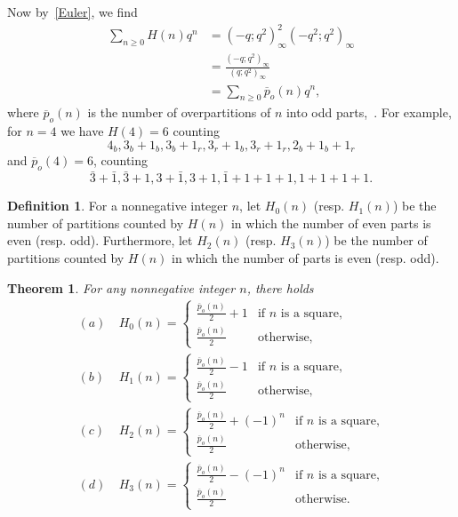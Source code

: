 \documentclass{amsart}
\numberwithin{equation}{section}
\newtheorem{theorem}{Theorem}
\theoremstyle{definition}
\newtheorem{definition}{Definition}
\newcommand{\fr}{\frac}
\begin{document}
%
Now by~\eqref{Euler}, we find
\begin{align}
\sum_{n\geq 0} H(n) q^n &= (-q;q^2)_\infty^2 (-q^2;q^2)_\infty \nonumber \\
&=\fr{(-q;q^2)_\infty}{(q;q^2)_\infty} \nonumber \\
& = \sum_{n\geq 0}\overline{p}_o(n) q^n, \label{H-id}
\end{align}
where $\overline{p}_o(n)$ is the number of overpartitions of $n$ into odd parts,~\cite{Chen, Hirschhorn-Sellers}.
For example, for $n=4$ we have
$H(4)=6$ counting
\[
4_b, 3_b+1_b, 3_b+1_r, 3_r+1_b,3_r+1_r,2_b+1_b+1_r
\]
and $\overline{p}_o(4)=6$, counting
\[
\bar{3}+\bar{1}, \bar{3}+1, 3+\bar{1}, 3+1, \bar{1}+1+1+1, 1+1+1+1.
\]
\begin{definition}
For a nonnegative integer $n$, let $H_0(n)$ (resp. $H_1(n)$) be the number of partitions
counted by $H(n)$ in which the number of even parts is even (resp. odd). Furthermore, let
$H_2(n)$ (resp. $H_3(n)$) be the number of partitions
counted by $H(n)$ in which the number of parts is even (resp. odd).
\end{definition}
%
\begin{theorem}\label{thm H-wt}
For any nonnegative integer $n$, there holds
\[
\begin{split}
(a)\ & H_0(n) =\begin{cases} \fr{\overline{p}_o(n)}{2} +1 & \text{if $n$ is a square,} \\
\fr{\overline{p}_o(n)}{2} & \text{otherwise,}
\end{cases}\\
(b)\ & H_1(n) =\begin{cases} \fr{\overline{p}_o(n)}{2}-1 & \text{if $n$ is a square,} \\
\fr{\overline{p}_o(n)}{2} & \text{otherwise,}
\end{cases} \\
(c)\ & H_2(n) =\begin{cases} \fr{\overline{p}_o(n)}{2} +(-1)^n & \text{if $n$ is a square,} \\
\fr{\overline{p}_o(n)}{2} & \text{otherwise,}
\end{cases} \\
(d)\ & H_3(n) =\begin{cases} \fr{\overline{p}_o(n)}{2}-(-1)^n & \text{if $n$ is a square,} \\
\fr{\overline{p}_o(n)}{2} & \text{otherwise.}
\end{cases}
\end{split}
\]
\end{theorem}
\end{document}
